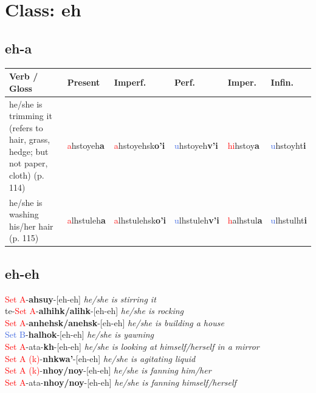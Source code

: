 \documentclass[oneside,openany]{book}%
\begin{document}
\section*{Class: eh}%
%
\needspace{1in}%
\subsection*{eh-a}%
\begin{tabularx}{\textwidth}{>{\hsize=1.5\hsize\RaggedRight}X >{\hsize=0.9\hsize}X >{\hsize=0.9\hsize}X >{\hsize=0.9\hsize}X >{\hsize=0.9\hsize}X >{\hsize=0.9\hsize}X}%
\toprule%
\textbf{Verb / Gloss}&\textbf{Present}&\textbf{Imperf.}&\textbf{Perf.}&\textbf{Imper.}&\textbf{Infin.}\\%
\midrule%
he/she is trimming it (refers to hair, grass, hedge; but not paper, cloth) (p. 114)&\textcolor{Red}{a}hstoyeh\textbf{a}&\textcolor{Red}{a}hstoyehsk\textbf{o'i}&\textcolor{RoyalBlue}{u}hstoyeh\textbf{v'i}&\textcolor{Red}{hi}hstoy\textbf{a}&\textcolor{RoyalBlue}{u}hstoyht\textbf{i}\\%
he/she is washing his/her hair (p. 115)&\textcolor{Red}{a}lhstuleh\textbf{a}&\textcolor{Red}{a}lhstulehsk\textbf{o'i}&\textcolor{RoyalBlue}{u}lhstuleh\textbf{v'i}&\textcolor{Red}{h}alhstul\textbf{a}&\textcolor{RoyalBlue}{u}lhstulht\textbf{i}\\%
\bottomrule%
\end{tabularx}%
\vspace{1em}%
\needspace{1in}%
\subsection*{eh-eh}%
\textcolor{Red}{Set A}{-}\textbf{ahsuy}{-}[eh-eh] \textit{ he/she is stirring it} \\%
te{-}\textcolor{Red}{Set A}{-}\textbf{alhihk/alihk}{-}[eh-eh] \textit{ he/she is rocking} \\%
\textcolor{Red}{Set A}{-}\textbf{anhehsk/anehsk}{-}[eh-eh] \textit{ he/she is building a house} \\%
\textcolor{RoyalBlue}{Set B}{-}\textbf{halhok}{-}[eh-eh] \textit{ he/she is yawning} \\%
\textcolor{Red}{Set A}{-}ata{-}\textbf{kh}{-}[eh-eh] \textit{ he/she is looking at himself/herself in a mirror} \\%
\textcolor{Red}{Set A (k)}{-}\textbf{nhkwa'}{-}[eh-eh] \textit{ he/she is agitating liquid} \\%
\textcolor{Red}{Set A (k)}{-}\textbf{nhoy/noy}{-}[eh-eh] \textit{ he/she is fanning him/her} \\%
\textcolor{Red}{Set A}{-}ata{-}\textbf{nhoy/noy}{-}[eh-eh] \textit{ he/she is fanning himself/herself} \\%
\vspace{1em}%
\needspace{1in}%
\end{document}
